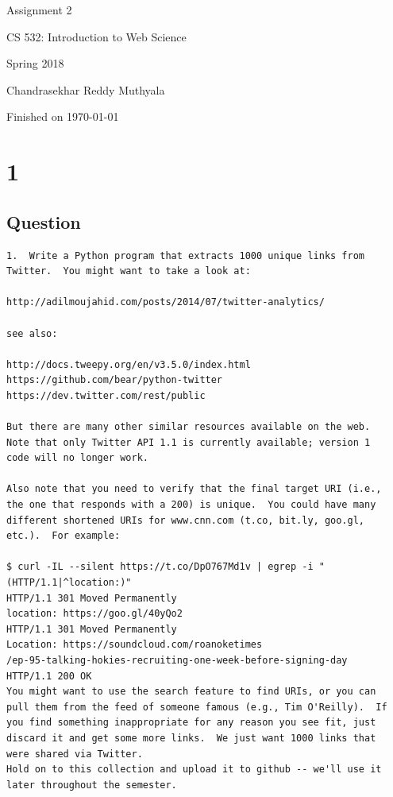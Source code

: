 \documentclass[letterpaper,11pt]{article}
\begin{document}
\begin{titlepage}

\begin{center}

\Huge{Assignment 2}

\Large{CS 532:  Introduction to Web Science}

\Large{Spring 2018}

\Large{Chandrasekhar Reddy Muthyala}

\Large Finished on \today

\end{center}

\end{titlepage}

\newpage


\section*{1}


\subsection*{Question}

\begin{verbatim}
1.  Write a Python program that extracts 1000 unique links from
Twitter.  You might want to take a look at:

http://adilmoujahid.com/posts/2014/07/twitter-analytics/

see also:

http://docs.tweepy.org/en/v3.5.0/index.html
https://github.com/bear/python-twitter
https://dev.twitter.com/rest/public

But there are many other similar resources available on the web.
Note that only Twitter API 1.1 is currently available; version 1
code will no longer work.

Also note that you need to verify that the final target URI (i.e.,
the one that responds with a 200) is unique.  You could have many
different shortened URIs for www.cnn.com (t.co, bit.ly, goo.gl,
etc.).  For example:

$ curl -IL --silent https://t.co/DpO767Md1v | egrep -i "(HTTP/1.1|^location:)"
HTTP/1.1 301 Moved Permanently
location: https://goo.gl/40yQo2
HTTP/1.1 301 Moved Permanently
Location: https://soundcloud.com/roanoketimes
/ep-95-talking-hokies-recruiting-one-week-before-signing-day
HTTP/1.1 200 OK
You might want to use the search feature to find URIs, or you can
pull them from the feed of someone famous (e.g., Tim O'Reilly).  If
you find something inappropriate for any reason you see fit, just
discard it and get some more links.  We just want 1000 links that
were shared via Twitter.
Hold on to this collection and upload it to github -- we'll use it
later throughout the semester.
\end{verbatim}
\end{document}
